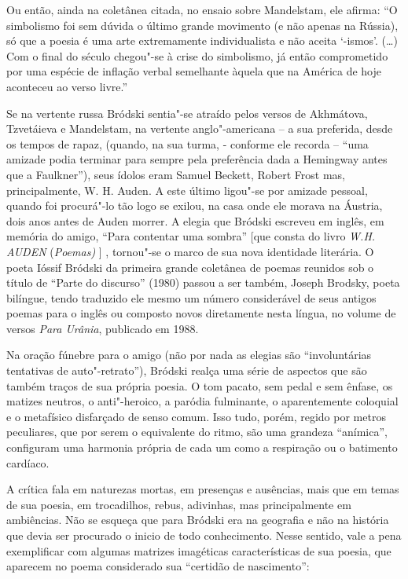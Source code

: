 Ou então, ainda na coletânea citada, no ensaio sobre Mandelstam, ele
afirma: ``O simbolismo foi sem dúvida o último grande movimento (e não
apenas na Rússia), só que a poesia é uma arte extremamente
individualista e não aceita `-ismos'. (\ldots{}) Com o final do século
chegou"-se à crise do simbolismo, já então comprometido por uma espécie
de inflação verbal semelhante àquela que na América de hoje aconteceu ao
verso livre.''

Se na vertente russa Bródski sentia"-se atraído pelos versos de
Akhmátova, Tzvetáieva e Mandelstam, na vertente anglo"-americana -- a sua
preferida, desde os tempos de rapaz, (quando, na sua turma, - conforme
ele recorda -- ``uma amizade podia terminar para sempre pela preferência
dada a Hemingway antes que a Faulkner''), seus ídolos eram Samuel
Beckett, Robert Frost mas, principalmente, W. H. Auden. A este último
ligou"-se por amizade pessoal, quando foi procurá"-lo tão logo se exilou,
na casa onde ele morava na Áustria, dois anos antes de Auden morrer. A
elegia que Bródski escreveu em inglês, em memória do amigo, ``Para
contentar uma sombra'' {[}que consta do livro \emph{W.H. AUDEN}
(\emph{Poemas)} {]} , tornou"-se o marco de sua nova identidade
literária. O poeta Ióssif Bródski da primeira grande coletânea de poemas
reunidos sob o título de ``Parte do discurso'' (1980) passou a ser
também, Joseph Brodsky, poeta bilíngue, tendo traduzido ele mesmo um
número considerável de seus antigos poemas para o inglês ou composto
novos diretamente nesta língua, no volume de versos \emph{Para Urânia},
publicado em 1988.

Na oração fúnebre para o amigo (não por nada as elegias são
``involuntárias tentativas de auto"-retrato''), Bródski realça uma série
de aspectos que são também traços de sua própria poesia. O tom pacato,
sem pedal e sem ênfase, os matizes neutros, o anti"-heroico, a paródia
fulminante, o aparentemente coloquial e o metafísico disfarçado de senso
comum. Isso tudo, porém, regido por metros peculiares, que por serem o
equivalente do ritmo, são uma grandeza ``anímica'', configuram uma
harmonia própria de cada um como a respiração ou o batimento cardíaco.

A crítica fala em naturezas mortas, em presenças e ausências, mais que
em temas de sua poesia, em trocadilhos, rebus, adivinhas, mas
principalmente em ambiências. Não se esqueça que para Bródski era na
geografia e não na história que devia ser procurado o inicio de todo
conhecimento. Nesse sentido, vale a pena exemplificar com algumas
matrizes imagéticas características de sua poesia, que aparecem no poema
considerado sua ``certidão de nascimento'':

